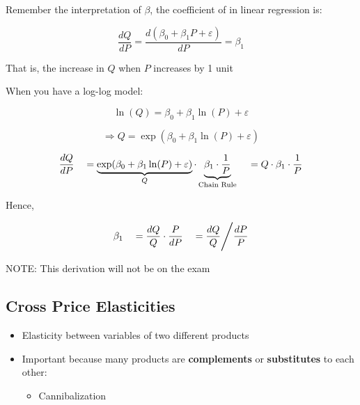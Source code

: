 \documentclass[10pt,article]{article}
\begin{document}

\begin{mdframed}[frametitle={Why?}]
Remember the interpretation of \(\beta\), the
coefficient of in linear regression is:

\[ 
   \dfrac{d Q}{d P} = \dfrac{d (\beta_0 + \beta_1 P +
   \varepsilon) }{d P} = \beta_1
\]

That is, the increase in \(Q\)  when \(P\)  increases by 1 unit

When you have a log-log model:

\[ \ln(Q) = \beta_0 + \beta_1 \ln (P) + \varepsilon\]

\[ \Rightarrow Q = \exp(\beta_0 + \beta_1 \ln (P) + \varepsilon ) \]

\[ \dfrac{d Q}{d P}  \quad = \underbrace{\exp(\beta_0 + \beta_1 \ln(P) +
          \varepsilon )}_{Q}
         \cdot \underbrace{\beta_1 \cdot \dfrac{1}{P}}_{\text{Chain Rule}} \\
           \quad =  Q \cdot \beta_1 \cdot \dfrac{1}{P} 
\]

Hence,

\[       \beta_1 \quad = \dfrac{d Q}{Q} \cdot \dfrac{P}{d P} \\
                 \quad = \dfrac{d Q}{Q} \Bigg/ \dfrac{d P}{P} \]


NOTE: This derivation will not be on the exam
\end{mdframed}
\subsection{Cross Price Elasticities}
\label{sec:org75ac81d}
\begin{itemize}
\item Elasticity between variables of two different products

\item Important because many products are \textbf{complements} or \textbf{substitutes} to each
other:

\begin{itemize}
\item Cannibalization
\end{itemize}
\end{itemize}
\end{document}
